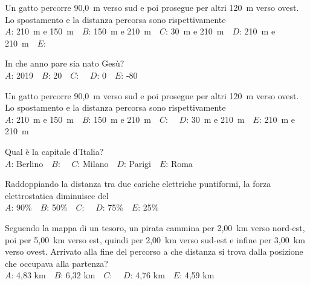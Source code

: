 \mcquestionfooter



\def\mcquestionnumber{11}


\mcquestionheader Un gatto percorre 90,0~m verso sud e poi prosegue per altri 120~m verso ovest. Lo spostamento e la distanza percorsa sono rispettivamente\\
{$A$}: 210~m e 150~m\ \ {$B$}: 150~m e 210~m\ \ {$C$}: 30~m e 210~m\ \ {$D$}: 210~m e 210~m\ \ {$E$}: \ \ 

\mcquestionfooter



\def\mcquestionnumber{12}


\mcquestionheader In che anno pare sia nato Gesù?\\
{$A$}: 2019\ \ {$B$}: 20\ \ {$C$}: \ \ {$D$}: 0\ \ {$E$}: -80\ \ 

\mcquestionfooter



\mcpaperfooter

\def\mcserialnumber{36}
\mcpaperheader


\def\mcquestionnumber{1}


\mcquestionheader Un gatto percorre 90,0~m verso sud e poi prosegue per altri 120~m verso ovest. Lo spostamento e la distanza percorsa sono rispettivamente\\
{$A$}: 210~m e 150~m\ \ {$B$}: 150~m e 210~m\ \ {$C$}: \ \ {$D$}: 30~m e 210~m\ \ {$E$}: 210~m e 210~m\ \ 

\mcquestionfooter



\def\mcquestionnumber{2}


\mcquestionheader Qual è la capitale d’Italia?\\
{$A$}: Berlino\ \ {$B$}: \ \ {$C$}: Milano\ \ {$D$}: Parigi\ \ {$E$}: Roma\ \ 

\mcquestionfooter



\def\mcquestionnumber{3}


\mcquestionheader Raddoppiando la distanza tra due cariche elettriche puntiformi, la forza elettrostatica diminuisce del\\
{$A$}: 90\%\ \ {$B$}: 50\%\ \ {$C$}: \ \ {$D$}: 75\%\ \ {$E$}: 25\%\ \ 

\mcquestionfooter



\def\mcquestionnumber{4}


\mcquestionheader Seguendo la mappa di un tesoro, un pirata cammina per 2,00~km verso nord-est, poi per 5,00~km verso est, quindi per 2,00~km verso sud-est e infine per 3,00~km verso ovest. Arrivato alla fine del percorso a che distanza si trova dalla posizione che occupava alla partenza?\\
{$A$}: 4,83 km\ \ {$B$}: 6,32 km\ \ {$C$}: \ \ {$D$}: 4,76 km\ \ {$E$}: 4,59 km\ \ 

